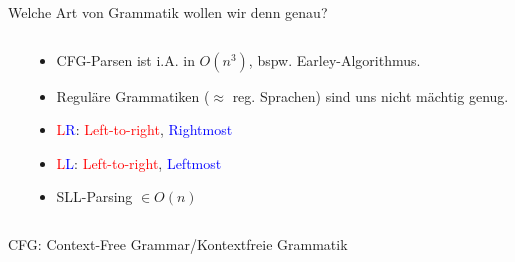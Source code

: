 \documentclass{beamer}
\begin{document}
\begin{frame}{Welche Art von Grammatik wollen wir denn genau?}
  \begin{columns}
    \begin{column}{0.5\textwidth}
    \end{column}
    \begin{column}{0.5\textwidth}
      \footnotesize

      \begin{itemize}
        \item CFG-Parsen ist i.A. in $O(n^3)$, bspw. Earley-Algorithmus.
        \item Reguläre Grammatiken ($\approx$ reg. Sprachen) sind uns nicht mächtig genug.
        \item \textcolor{red}{L}\textcolor{blue}{R}: \textcolor{red}{Left-to-right}, \textcolor{blue}{Rightmost}
        \item \textcolor{red}{L}\textcolor{blue}{L}: \textcolor{red}{Left-to-right}, \textcolor{blue}{Leftmost}
        \item SLL-Parsing $\in O(n)$
      \end{itemize}
    \end{column}
  \end{columns}

  \vspace{1cm}
  \center
  CFG: Context-Free Grammar/Kontextfreie Grammatik
\end{frame}
\end{document}
